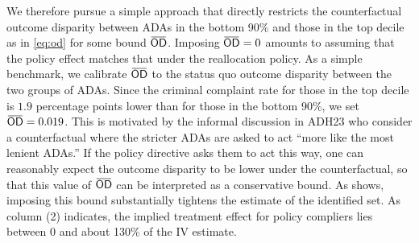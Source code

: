 \documentclass[12pt]{article}%
\theoremstyle{definition}
\newcommand\1{\operatorname{I}\indicatorfence}
\newcommand{\overbar}[1]{\mkern 1.5mu\overline{\mkern-1.5mu#1\mkern-1.5mu}%
  \mkern 1.5mu}%
\newcommand{\OD}{\mathsf{OD}}
\begin{document}
We therefore pursue a simple approach that directly restricts the counterfactual
outcome disparity between ADAs in the bottom 90\% and those in the top decile as
in \cref{eq:od} for some bound $\overbar{\OD}$. Imposing $\overbar{\OD}=0$
amounts to assuming that the policy effect matches that under the reallocation
policy. As a simple benchmark, we calibrate $\overbar{\OD}$ to the status quo
outcome disparity between the two groups of ADAs. Since the criminal complaint
rate for those in the top decile is $1.9$ percentage points lower than for those
in the bottom 90\%, we set $\overbar{\OD}=\sufODc$. This is motivated by the
informal discussion in ADH23 who consider a counterfactual where the stricter
ADAs are asked to act ``more like the most lenient ADAs.'' If the policy
directive asks them to act this way, one can reasonably expect the outcome
disparity to be lower under the counterfactual, so that this value of
$\overbar{\OD}$ can be interpreted as a conservative bound. As
 shows, imposing this bound substantially tightens the
estimate of the identified set. As column (2) indicates, the implied treatment
effect for policy compliers lies between $0$ and about 130\% of the IV estimate.
%
\end{document}

